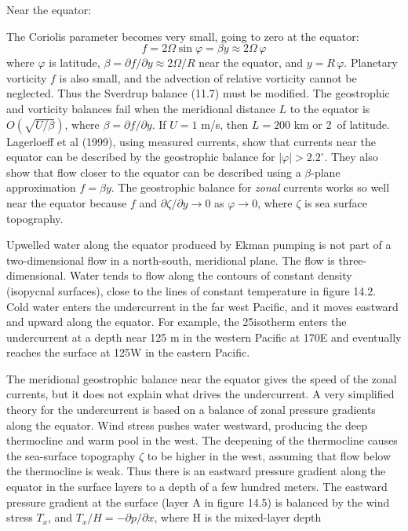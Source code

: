 Near the equator:
\begin{enumerate}
\vitem
The Coriolis parameter becomes very small, going to zero
at the equator:
\begin{equation}
f=2\Omega \sin\varphi = \beta y \approx 2\Omega \,\varphi
\end{equation}
where $\varphi$ is latitude, $\beta = \partial f/\partial y \approx 2\Omega/R$
near the equator, and $y=R\,\varphi$.
\vitem
Planetary vorticity $f$ is also small, and the advection of
relative vorticity cannot be neglected. Thus the Sverdrup balance (11.7) must
be modified.
\vitem
The geostrophic and vorticity balances fail when
the meridional distance $L$ to the equator is $O\left(\sqrt{U/\beta}\right)$, where $\beta =
\partial f / \partial y$. If
$U=1$ m/s, then $L=200$ km or 2\degrees\ of latitude. Lagerloeff et al (1999),
using measured currents, show that currents near the equator can be
described by the geostrophic balance for $|\varphi
| > 2.2^{\circ}$. They also show that flow closer to the equator can be described using a
$\beta
$-plane approximation $f = \beta y$.
\vitem
The geostrophic balance for \textit{zonal} currents works so well near the
equator because $f$ and $\partial \zeta/\partial y \rightarrow 0$ as
$\varphi \rightarrow 0$, where $\zeta$ is sea surface topography.
\end{enumerate}
\vspace{-1.5ex}

Upwelled water along the equator produced by Ekman pumping is
not part of a two-dimensional flow in a north-south, meridional plane. The flow is three-dimensional. Water tends to flow along the contours of constant density (isopycnal surfaces), close to the lines of constant temperature in figure 14.2.  Cold water enters the undercurrent in the far west Pacific, and it moves eastward and upward along the equator. For example, the 25\degrees isotherm enters the undercurrent at a depth near 125 m in the western Pacific at 170\degrees E and eventually reaches the surface at 125\degrees W in the eastern Pacific.

The meridional geostrophic balance near the equator gives the speed of the zonal
currents, but it does not explain what drives the undercurrent. A very
simplified theory for the undercurrent is based on a balance of zonal pressure
gradients along the equator. Wind stress pushes water westward, producing the
deep thermocline and warm pool in the west. The deepening of the
thermocline causes the sea-surface topography $\zeta$ to be
higher in the west, assuming that flow below the thermocline is weak. Thus there is an
eastward pressure gradient along the equator in the surface layers to a
depth of a few hundred meters. The eastward pressure gradient at the surface (layer A in figure 14.5)
is balanced by the wind stress $T_x $, and $T_x / H = -\partial p/\partial x$, where H is the mixed-layer depth

